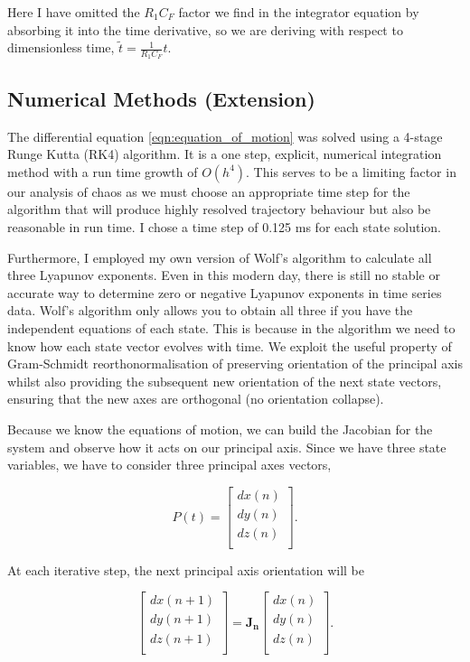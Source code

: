 \documentclass[aps,prl,reprint,10pt,amsmath,amssymb,superscriptaddress,a4paper]{revtex4-2}
\begin{document}
Here I have omitted the $R_1 C_F$ factor we find in the integrator equation by absorbing it into the time derivative, so we are deriving with respect to dimensionless 
time, $\tilde{t} = \frac{1}{R_1 C_F} t$.

\subsection{Numerical Methods (Extension)}
The differential equation \ref{eqn:equation_of_motion} was solved using a 4-stage Runge Kutta (RK4) algorithm. It is a one step, explicit, numerical integration 
method with a run time growth of $O(h^4)$. This serves to be a limiting factor in our analysis of chaos as we must choose an appropriate time step for the algorithm that 
will produce highly resolved trajectory behaviour but also be reasonable in run time. I chose a time step of 0.125 ms for each state solution. 

Furthermore, I employed my own version of Wolf's algorithm \citep{wolf} to calculate all three Lyapunov exponents. Even in this modern day, there is still no stable or 
accurate way to determine zero or negative Lyapunov exponents in time series data. Wolf's algorithm only allows you to obtain all three if you have the independent equations  
of each state. This is because in the algorithm we need to know how each state vector evolves with time. We exploit the useful property of Gram-Schmidt reorthonormalisation
of preserving orientation of the principal axis whilst also providing the subsequent new orientation of the next state vectors, ensuring that the new axes are orthogonal 
(no orientation collapse).

Because we know the equations of motion, we can build the Jacobian for the system and observe how it acts on our principal axis. Since we have three state variables, we have 
to consider three principal axes vectors, 

\begin{equation}
    P(t) = \begin{bmatrix}
        dx(n) \\
        dy(n) \\
        dz(n) \\
    \end{bmatrix}.
\end{equation}

At each iterative step, the next principal axis orientation will be 

\begin{equation}
    \begin{bmatrix}
        dx(n+1) \\
        dy(n+1) \\
        dz(n+1) \\
    \end{bmatrix} = \mathbf{J_{n}}
    \begin{bmatrix}
        dx(n) \\
        dy(n) \\
        dz(n) \\
    \end{bmatrix}.
\end{equation}
\end{document}
